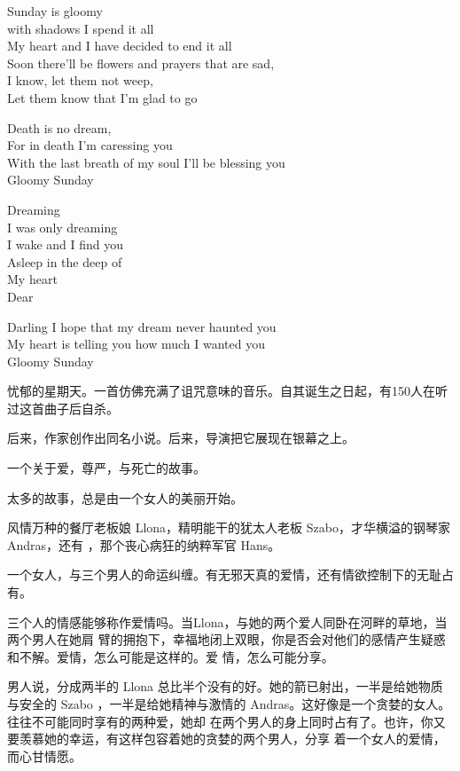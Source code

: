 \documentclass[12pt,a4paper]{article}
\begin{document}
		Sunday is gloomy \\
		with shadows I spend it all \\
		My heart and I have decided to end it all \\
		Soon there’ll be flowers and prayers that are sad, \\
		I know, let them not weep, \\
		Let them know that I’m glad to go

		Death is no dream, \\
		For in death I’m caressing you \\
		With the last breath of my soul I’ll be blessing you \\
		Gloomy Sunday

		Dreaming \\
		I was only dreaming \\
		I wake and I find you \\
		Asleep in the deep of \\
		My heart \\
		Dear

		Darling I hope that my dream never haunted you \\
		My heart is telling you how much I wanted you \\
		Gloomy Sunday
		\endlongpoem

		忧郁的星期天。一首仿佛充满了诅咒意味的音乐。自其诞生之日起，有150人在听过这首曲子后自杀。\par
		后来，作家创作出同名小说。后来，导演把它展现在银幕之上。\par
		一个关于爱，尊严，与死亡的故事。

		太多的故事，总是由一个女人的美丽开始。

		风情万种的餐厅老板娘 Llona，精明能干的犹太人老板 Szabo，才华横溢的钢琴家 Andras，还有
	，那个丧心病狂的纳粹军官 Hans。

		一个女人，与三个男人的命运纠缠。有无邪天真的爱情，还有情欲控制下的无耻占有。

		三个人的情感能够称作爱情吗。当Llona，与她的两个爱人同卧在河畔的草地，当两个男人在她肩
	臂的拥抱下，幸福地闭上双眼，你是否会对他们的感情产生疑惑和不解。爱情，怎么可能是这样的。爱
	情，怎么可能分享。

		男人说，分成两半的 Llona 总比半个没有的好。她的箭已射出，一半是给她物质与安全的 Szabo
	，一半是给她精神与激情的 Andras。这好像是一个贪婪的女人。往往不可能同时享有的两种爱，她却
	在两个男人的身上同时占有了。也许，你又要羡慕她的幸运，有这样包容着她的贪婪的两个男人，分享
	着一个女人的爱情，而心甘情愿。
\end{document}
